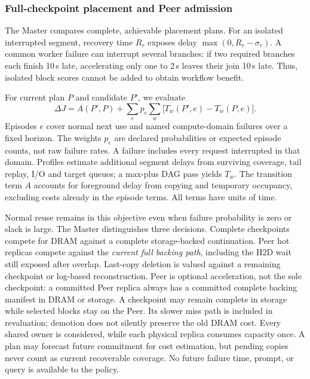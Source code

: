 \subsubsection{Full-checkpoint placement and Peer admission}
\label{sec:placement-value}

The Master compares complete, achievable placement plans. For an isolated
interrupted segment, recovery time $R_r$ exposes delay
$\max(0,R_r-\sigma_r)$. A common worker failure can interrupt several
branches: if two required branches each finish 10\,s late, accelerating
only one to 2\,s leaves their join 10\,s late. Thus, isolated block scores
cannot be added to obtain workflow benefit.

For current plan $P$ and candidate $P'$, we evaluate
\begin{equation}
 \Delta J=A(P',P)+\sum_e p_e\sum_w
       \bigl[T_w(P',e)-T_w(P,e)\bigr].
 \label{eq:value}
\end{equation}
Episodes $e$ cover normal next use and named compute-domain failures over
a fixed horizon. The weights $p_e$ are declared probabilities or expected
episode counts, not raw failure rates. A failure includes every request
interrupted in that domain. Profiles estimate additional segment delays
from surviving coverage, tail replay, I/O and target queues; a max-plus
DAG pass yields $T_w$. The transition term $A$ accounts for foreground
delay from copying and temporary occupancy, excluding costs already in
the episode terms. All terms have units of time.

Normal reuse remains in this objective even when failure probability is
zero or slack is large. The Master distinguishes three decisions.
Complete checkpoints compete for DRAM against a complete storage-backed
continuation. Peer hot replicas compete against the \emph{current full
backing path}, including the H2D wait still exposed after overlap.
Last-copy deletion is valued against a remaining checkpoint or log-based
reconstruction. Peer is optional acceleration, not the sole checkpoint:
a committed Peer replica always has a committed complete backing manifest
in DRAM or storage. A checkpoint may remain complete in storage while
selected blocks stay on the Peer. Its slower miss path is included in
revaluation; demotion does not silently preserve the old DRAM cost. Every shared owner is considered,
while each physical replica consumes capacity once. A plan may forecast future commitment for cost estimation, but pending
copies never count as current recoverable coverage.
No future failure time, prompt, or query is available to the policy.

